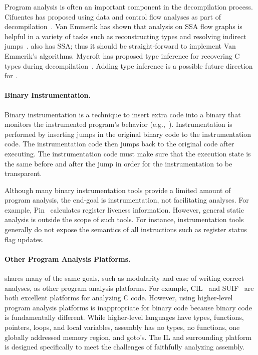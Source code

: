 Program analysis is often an important component in the decompilation
process. Cifuentes has proposed using data and control flow analyses
as part of decompilation~\cite{cifuentes:1994}.  Van Emmerik has shown
that analysis on SSA flow graphs is helpful in a variety of tasks such
as reconstructing types and resolving indirect
jumps~\cite{vanemmerik:2007}.  \bap also has SSA;  thus it should
be straight-forward to implement Van Emmerik's algorithms. Mycroft has
proposed type inference for recovering C types during
decompilation~\cite{mycroft:1999}.  Adding type inference is a
possible future direction for \bap.


\paragraph{Binary Instrumentation.} Binary instrumentation is a
technique to insert extra code into a binary that monitors the
instrumented program's behavior
(e.g.,~\cite{srivastava:1994,larus:1995,luk:2005,nethercote:2004:phd,nanda:2006,dynamorio,dyninst}). Instrumentation
is performed by inserting jumps in the original binary code to the
instrumentation code.  The instrumentation code then jumps back to the
original code after executing. The instrumentation code must make sure
that the execution state is the same before and after the jump in
order for the instrumentation to be transparent.

Although many binary instrumentation tools provide a limited amount of
program analysis, the end-goal is instrumentation, not facilitating
analyses.  For example, Pin~\cite{luk:2005} calculates register
liveness information. However, general static analysis is outside the
scope of such tools. For instance, instrumentation tools generally do
not expose the semantics of all instructions such as register status
flag updates.


\paragraph{Other Program Analysis Platforms.} \bap shares many of the same
goals, such as modularity and ease of writing correct analyses, as
other program analysis platforms.  For example,
CIL~\cite{necula:2002:cil} and SUIF~\cite{suif} are both excellent
platforms for analyzing C code.  However, using higher-level program
analysis platforms is inappropriate for binary code because binary
code is fundamentally different. While higher-level languages have
types, functions, pointers, loops, and local variables, assembly has
no types, no functions, one globally addressed memory region, and
goto's. The \bap IL and surrounding platform is designed specifically
to meet the challenges of faithfully analyzing assembly.


